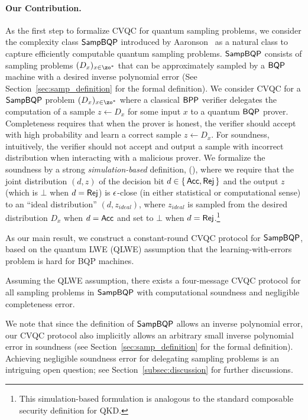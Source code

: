 \paragraph{Our Contribution.}
As the first step to formalize CVQC for quantum sampling problems, we consider the complexity class $\operatorname{\mathsf{SampBQP}}$ introduced by Aaronson~\cite{aaronson_2013} as a natural class to capture efficiently computable quantum sampling problems. 
$\operatorname{\mathsf{SampBQP}}$ consists of sampling problems $(D_x)_{x\in\zo^*}$ that can be approximately sampled by a $\operatorname{\mathsf{BQP}}$ machine with a desired inverse polynomial error (See Section~\ref{sec:samp_definition} for the formal definition). We consider CVQC for a $\operatorname{\mathsf{SampBQP}}$ problem $(D_x)_{x\in\zo^*}$ where a classical $\operatorname{\mathsf{BPP}}$ verifier delegates the computation of a sample $z\leftarrow D_x$ for some input $x$ to a quantum $\operatorname{\mathsf{BQP}}$ prover. Completeness requires that when the prover is honest, the verifier should accept with high probability and learn a correct sample $z\leftarrow D_x$. For soundness, intuitively, the verifier should not accept and output a sample with incorrect distribution  when interacting with a malicious prover. We formalize the soundness by a strong \emph{simulation-based} definition, (),
where we require that the joint distribution $(d,z)$ of the decision bit $d \in \set{\mathsf{Acc}, \mathsf{Rej}}$ and the output $z$ (which is $\bot$ when $d = \mathsf{Rej}$) is $\epsilon$-close (in  either statistical or computational sense) to an ``ideal distribution'' $(d,z_{ideal})$, where $z_{ideal}$ is sampled from the desired distribution $D_x$ when $d = \mathsf{Acc}$ and set to $\bot$ when $d = \mathsf{Rej}$.\footnote{This simulation-based formulation is analogous to the standard composable security definition for QKD.}

As our main result, we construct a constant-round CVQC protocol for $\operatorname{\mathsf{SampBQP}}$, based on the quantum LWE (QLWE) assumption that the learning-with-errors problem is hard for BQP machines. 
\begin{theorem}[informal] \label{thm:qpip0-informal}
Assuming the QLWE assumption, there exists a four-message CVQC protocol for all sampling problems in $\operatorname{\mathsf{SampBQP}}$ with computational soundness and negligible completeness error.
\end{theorem}

We note that since the definition of $\operatorname{\mathsf{SampBQP}}$ allows an inverse polynomial error, our CVQC protocol also implicitly allows an arbitrary small inverse polynomial error in  soundness (see Section~\ref{sec:samp_definition} for the formal definition). Achieving negligible soundness error for delegating sampling problems is an intriguing open question; see Section~\ref{subsec:discussion} for further discussions.

